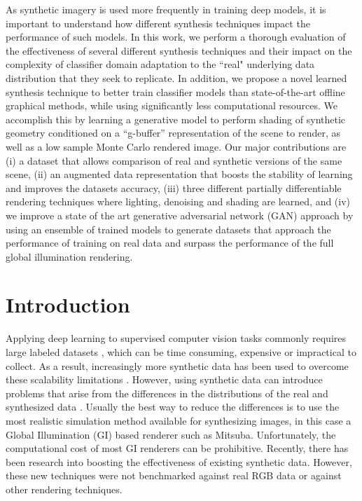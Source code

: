 \documentclass[10pt,twocolumn,letterpaper]{article}
\begin{document}
As synthetic imagery is used more frequently in training deep models, it is important to understand how different synthesis techniques impact the performance of such models. In this work, we perform a thorough evaluation of the effectiveness of several different synthesis techniques and their impact on the complexity of classifier domain adaptation to the ``real" underlying data distribution that they seek to replicate. In addition, we propose a novel learned synthesis technique to better train classifier models than state-of-the-art offline graphical methods, while using significantly less computational resources.  We accomplish this by learning a generative model to perform shading of synthetic geometry conditioned on a ``g-buffer'' representation of the scene to render, as well as a low sample Monte Carlo rendered image. Our major contributions are (i) a dataset that allows comparison of real and synthetic versions of the same scene, (ii) an augmented data representation that boosts the stability of learning and improves the datasets accuracy, (iii) three different partially differentiable rendering techniques where lighting, denoising and shading are learned, and (iv) we improve a state of the art generative adversarial network (GAN) approach by using an ensemble of trained models to generate datasets that approach the performance of training on real data and surpass the performance of the full global illumination rendering.
\section{Introduction}

Applying deep learning to supervised computer vision tasks commonly requires large labeled datasets \cite{imagenet, coco}, which can be time consuming, expensive or impractical to collect. As a result, increasingly more synthetic data has been used to overcome these scalability limitations \cite{DBLP:journals/corr/RichterVRK16, DBLP:journals/corr/ShafaeiLS16, DBLP:journals/corr/ZhangSYSLJF16, DBLP:journals/corr/SixtWL17}. However, using synthetic data can introduce problems that arise from the differences in the distributions of the real and synthesized data \cite{2014arXiv1409.7495G}. Usually the best way to reduce the differences is to use the most realistic simulation method available for synthesizing images, in this case a Global Illumination (GI) based renderer such as Mitsuba\cite{Mitsuba}.  Unfortunately, the computational cost of most GI renderers can be prohibitive.  Recently, there has been research into boosting the effectiveness of existing synthetic data\cite{DBLP:journals/corr/ShrivastavaPTSW16}.  However, these new techniques were not benchmarked against real RGB data or against other rendering techniques.
\end{document}
